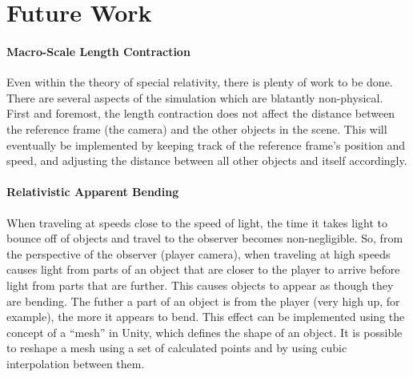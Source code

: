 \documentclass[12pt]{article}
\begin{document}
\inputminted[firstline=2,lastline=10,linenos,fontsize=\footnotesize,bgcolor=codebg]{csharp}{../unity/Assets/Scripts/CameraFollow.cs}



\section{Future Work}

\paragraph{Macro-Scale Length Contraction}
Even within the theory of special relativity, there is plenty of work to be done. There are several aspects of the simulation which are blatantly non-physical. First and foremost, the length contraction does not affect the distance between the reference frame (the camera) and the other objects in the scene. This will eventually be implemented by keeping track of the reference frame's position and speed, and adjusting the distance between all other objects and itself accordingly.

\paragraph{Relativistic Apparent Bending}
When traveling at speeds close to the speed of light, the time it takes light to bounce off of objects and travel to the observer becomes non-negligible. So, from the perspective of the observer (player camera), when traveling at high speeds causes light from parts of an object that are closer to the player to arrive before light from parts that are further. This causes objects to appear as though they are bending. The futher a part of an object is from the player (very high up, for example), the more it appears to bend. This effect can be implemented using the concept of a \enquote{mesh} in Unity, which defines the shape of an object. It is possible to reshape a mesh using a set of calculated points and by using cubic interpolation between them.
\end{document}
